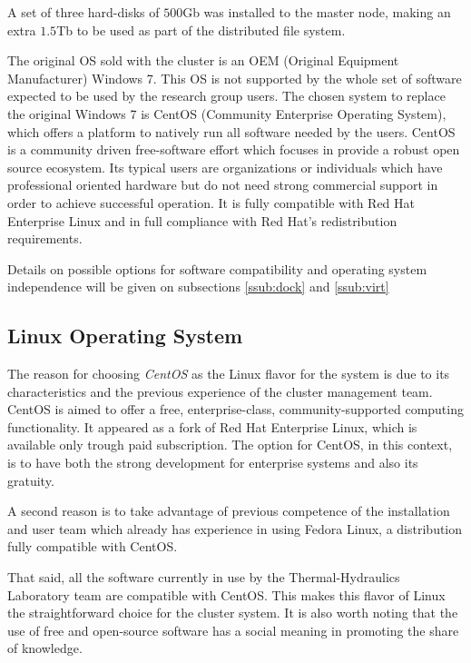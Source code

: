 \documentclass[twoside,a4paper,12pt,english]{inac19}
\begin{document}
A set of three hard-disks of $500$Gb was installed to the master node, making an extra $1.5$Tb to be used as part
of the distributed file system.

The original OS sold with the cluster is an OEM (Original Equipment Manufacturer) Windows 7{\textregistered}\cite{windows7}. This
OS is not supported by the whole set of software expected to be used by the research group users. The chosen
system to replace the original Windows 7 is CentOS (Community Enterprise Operating System)\cite{centos}, which offers a platform to natively run all
software needed by the users. CentOS is a community driven free-software effort which focuses in provide a robust open source ecosystem.
Its typical users are organizations or individuals which have professional oriented hardware but do not need strong commercial support
in order to achieve successful operation. It is fully compatible with Red Hat Enterprise Linux and in full compliance with Red Hat's
redistribution requirements.

Details on possible options for software compatibility and operating system independence will be given on subsections \ref{ssub:dock} and \ref{ssub:virt}

\subsection{Linux Operating System}

The reason for choosing \textit{CentOS} as the Linux flavor for the system is due to its characteristics and the previous
experience of the cluster management team. CentOS is aimed to offer a free, enterprise-class, community-supported computing
functionality. It appeared as a fork of Red Hat Enterprise Linux, which is available only trough paid subscription. The option
for CentOS, in this context, is to have both the strong development for enterprise systems and also its gratuity.

A second reason is to take advantage of previous competence of the installation and user team which already has experience
in using Fedora Linux, a distribution fully compatible with CentOS.

That said, all the software currently in use by the Thermal-Hydraulics Laboratory team are compatible with CentOS. This
makes this flavor of Linux the straightforward choice for the cluster system. It is also worth noting that the use of
free and open-source software has a social meaning in promoting the share of knowledge.
\end{document}
